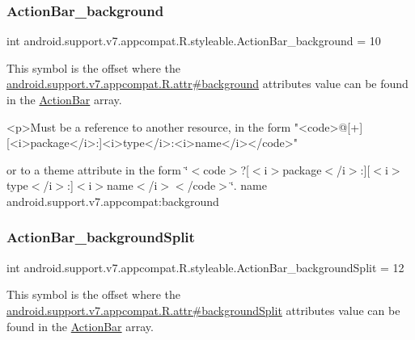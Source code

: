 \subsubsection{\texorpdfstring{Action\+Bar\+\_\+background}{ActionBar\_background}}
{\footnotesize\ttfamily int android.\+support.\+v7.\+appcompat.\+R.\+styleable.\+Action\+Bar\+\_\+background = 10\hspace{0.3cm}{\ttfamily [static]}}

This symbol is the offset where the \hyperlink{classandroid_1_1support_1_1v7_1_1appcompat_1_1R_1_1attr_a9b1855dc381ac6067c08e52a28f5c096}{android.\+support.\+v7.\+appcompat.\+R.\+attr\#background} attribute\textquotesingle{}s value can be found in the \hyperlink{classandroid_1_1support_1_1v7_1_1appcompat_1_1R_1_1styleable_a5941dc15714398e9ec9afaa0155cc1cf}{Action\+Bar} array.

\begin{DoxyVerb}      <p>Must be a reference to another resource, in the form "<code>@[+][<i>package</i>:]<i>type</i>:<i>name</i></code>"
\end{DoxyVerb}
 or to a theme attribute in the form \char`\"{}$<$code$>$?\mbox{[}$<$i$>$package$<$/i$>$\+:\mbox{]}\mbox{[}$<$i$>$type$<$/i$>$\+:\mbox{]}$<$i$>$name$<$/i$>$$<$/code$>$\char`\"{}.  name android.\+support.\+v7.\+appcompat\+:background \mbox{\label{classandroid_1_1support_1_1v7_1_1appcompat_1_1R_1_1styleable_ad35a58b3583d91f8dac919846b6a99c1}} 
\subsubsection{\texorpdfstring{Action\+Bar\+\_\+background\+Split}{ActionBar\_backgroundSplit}}
{\footnotesize\ttfamily int android.\+support.\+v7.\+appcompat.\+R.\+styleable.\+Action\+Bar\+\_\+background\+Split = 12\hspace{0.3cm}{\ttfamily [static]}}

This symbol is the offset where the \hyperlink{classandroid_1_1support_1_1v7_1_1appcompat_1_1R_1_1attr_a39a8f294508e3340e83275f406757bfc}{android.\+support.\+v7.\+appcompat.\+R.\+attr\#background\+Split} attribute\textquotesingle{}s value can be found in the \hyperlink{classandroid_1_1support_1_1v7_1_1appcompat_1_1R_1_1styleable_a5941dc15714398e9ec9afaa0155cc1cf}{Action\+Bar} array.

